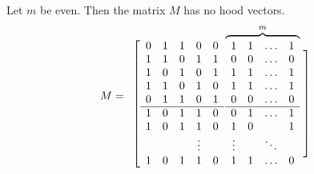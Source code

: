 \begin{example}Let $m$ be even. Then the matrix $M$ has no hood vectors.
\[	\linespread{1}\selectfont M = 
	\begin{array}{c@{}c}
		\left[
		\begin{array}{ccccc}
			0	& 1	& 1	& 0	& 0\\
			1	& 1	& 0	& 1	& 1\\
			1	& 0	& 1	& 0	& 1\\
			1	& 1	& 0	& 1	& 0\\
			0	& 1	& 1	& 0	& 1\\\hline
%
			1	& 0	& 1	& 1	& 0\\
			1	& 0	& 1	& 1	& 0\\
			&&&\vdots\\
			1	& 0	& 1	& 1	& 0
		\end{array}\right.
		&\overbrace{\begin{array}{cccc}
			1	& 1	& \ldots & 1\\
			0	& 0	& \ldots	& 0\\
			1	& 1	& \ldots	& 1\\
			1	& 1	& \ldots	& 1\\
			0	& 0	& \ldots	& 0\\\hline
%
			0	& 1	& \ldots	& 1\\
			1	& 0	& 		& 1\\
			\vdots&&\ddots\\
			1	& 1	& \ldots	& 0
		\end{array}}^m
		\left.\vphantom{\begin{array}{c}a\\a\\a\\a\\a\\a\\a\\a\end{array}}\right]
	\end{array}
\]
\end{example}
